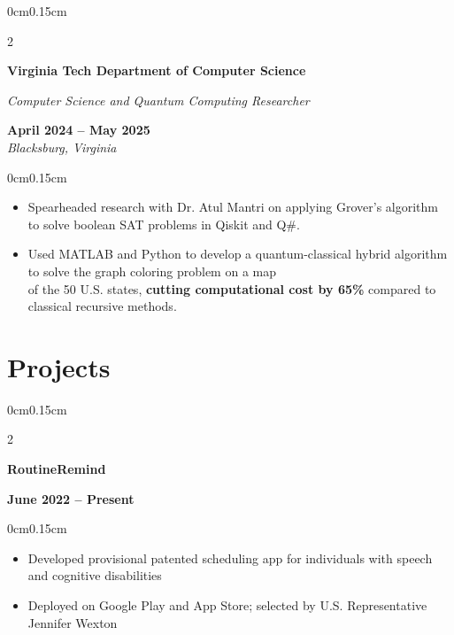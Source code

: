 \documentclass[10pt, letterpaper]{article}
\newenvironment{highlights}{
    \begin{itemize}[topsep=0pt, parsep=0pt, partopsep=0pt, itemsep=0pt, leftmargin=0.6cm]
}{
    \end{itemize}
}
\newenvironment{onecolentry}{
    \begin{adjustwidth}{0cm}{0.15cm}
}{
    \end{adjustwidth}
}
\newenvironment{twocolentry}[2][]{
    \onecolentry
    \def\secondColumn{#2}
    \setcolumnwidth{\fill, 4cm}
    \begin{paracol}{2}
}{
    \switchcolumn \raggedleft \secondColumn
    \end{paracol}
    \endonecolentry
}
\begin{document}
    \vspace{0.05cm}

    \begin{twocolentry}{\textbf{April 2024 -- May 2025} \\ \textit{Blacksburg, Virginia}}
        \textbf{Virginia Tech Department of Computer Science}
        
        \textit{Computer Science and Quantum Computing Researcher}
    \end{twocolentry}
    \vspace{-0.15cm}
    \begin{onecolentry}
        \begin{highlights}
            \item Spearheaded research with Dr. Atul Mantri on applying Grover's algorithm to solve boolean SAT problems in Qiskit and Q\#.
            \item Used MATLAB and Python to develop a quantum-classical hybrid algorithm to solve the graph coloring problem on a map \\ of the 50 U.S. states, \textbf{cutting computational cost by 65\%} compared to classical recursive methods.
        \end{highlights}
    \end{onecolentry}

    \vspace{0.05cm}

    \section{Projects}
    \vspace{0.1cm}

    \begin{twocolentry}{\textbf{June 2022 -- Present}}
        \textbf{RoutineRemind}
    \end{twocolentry}
    \vspace{-0.15cm}
    \begin{onecolentry}
        \begin{highlights}
            \item Developed provisional patented scheduling app for individuals with speech and cognitive disabilities
            \item Deployed on Google Play and App Store; selected by U.S. Representative Jennifer Wexton
        \end{highlights}
    \end{onecolentry}
\end{document}
